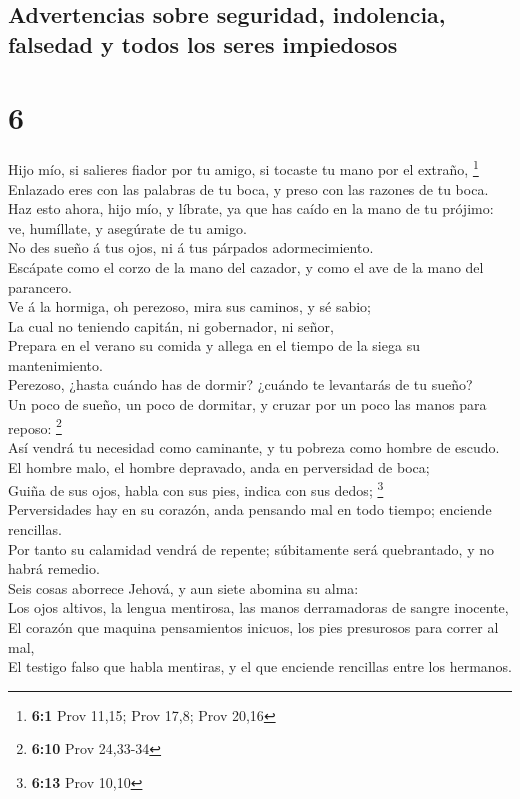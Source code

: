 \hypertarget{advertencias-sobre-seguridad-indolencia-falsedad-y-todos-los-seres-impiedosos}{%
\subsection{Advertencias sobre seguridad, indolencia, falsedad y todos
los seres
impiedosos}\label{advertencias-sobre-seguridad-indolencia-falsedad-y-todos-los-seres-impiedosos}}

\hypertarget{section-5}{%
\section{6}\label{section-5}}

 Hijo mío, si salieres fiador por tu amigo, si tocaste tu
mano por el extraño, \footnote{\textbf{6:1} Prov 11,15; Prov 17,8; Prov
  20,16}\\
 Enlazado eres con las palabras de tu boca, y preso con las
razones de tu boca.\\
 Haz esto ahora, hijo mío, y líbrate, ya que has caído en la
mano de tu prójimo: ve, humíllate, y asegúrate de tu amigo.\\
 No des sueño á tus ojos, ni á tus párpados
adormecimiento.\\
 Escápate como el corzo de la mano del cazador, y como el
ave de la mano del parancero.\\
 Ve á la hormiga, oh perezoso, mira sus caminos, y sé
sabio;\\
 La cual no teniendo capitán, ni gobernador, ni señor,\\
 Prepara en el verano su comida y allega en el tiempo de la
siega su mantenimiento.\\
 Perezoso, ¿hasta cuándo has de dormir? ¿cuándo te
levantarás de tu sueño?\\
 Un poco de sueño, un poco de dormitar, y cruzar por un
poco las manos para reposo: \footnote{\textbf{6:10} Prov 24,33-34}\\
 Así vendrá tu necesidad como caminante, y tu pobreza como
hombre de escudo.\\
 El hombre malo, el hombre depravado, anda en perversidad
de boca;\\
 Guiña de sus ojos, habla con sus pies, indica con sus
dedos; \footnote{\textbf{6:13} Prov 10,10}\\
 Perversidades hay en su corazón, anda pensando mal en todo
tiempo; enciende rencillas.\\
 Por tanto su calamidad vendrá de repente; súbitamente será
quebrantado, y no habrá remedio.\\
 Seis cosas aborrece Jehová, y aun siete abomina su alma:\\
 Los ojos altivos, la lengua mentirosa, las manos
derramadoras de sangre inocente,\\
 El corazón que maquina pensamientos inicuos, los pies
presurosos para correr al mal,\\
 El testigo falso que habla mentiras, y el que enciende
rencillas entre los hermanos.

